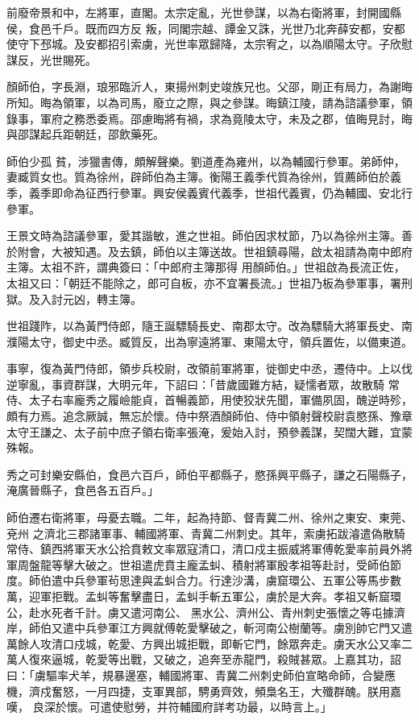 \begin{pinyinscope}
 前廢帝景和中，左將軍，直閣。太宗定亂，光世參謀，以為右衛將軍，封開國縣侯，食邑千戶。既而四方反
 叛，同閣宗越、譚金又誅，光世乃北奔薛安都，安都使守下邳城。及安都招引索虜，光世率眾歸降，太宗宥之，以為順陽太守。子欣慰謀反，光世賜死。



 顏師伯，字長淵，琅邪臨沂人，東揚州刺史竣族兄也。父邵，剛正有局力，為謝晦所知。晦為領軍，以為司馬，廢立之際，與之參謀。晦鎮江陵，請為諮議參軍，領錄事，軍府之務悉委焉。邵慮晦將有禍，求為竟陵太守，未及之郡，值晦見討，晦與邵謀起兵距朝廷，邵飲藥死。



 師伯少孤
 貧，涉獵書傳，頗解聲樂。劉道產為雍州，以為輔國行參軍。弟師仲，妻臧質女也。質為徐州，辟師伯為主簿。衡陽王義季代質為徐州，質薦師伯於義季，義季即命為征西行參軍。興安侯義賓代義季，世祖代義賓，仍為輔國、安北行參軍。



 王景文時為諮議參軍，愛其諧敏，進之世祖。師伯因求杖節，乃以為徐州主簿。善於附會，大被知遇。及去鎮，師伯以主簿送故。世祖鎮尋陽，啟太祖請為南中郎府主簿。太祖不許，謂典簽曰：「中郎府主簿那得
 用顏師伯。」世祖啟為長流正佐，太祖又曰：「朝廷不能除之，郎可自板，亦不宜署長流。」世祖乃板為參軍事，署刑獄。及入討元凶，轉主簿。



 世祖踐阼，以為黃門侍郎，隨王誕驃騎長史、南郡太守。改為驃騎大將軍長史、南濮陽太守，御史中丞。臧質反，出為寧遠將軍、東陽太守，領兵置佐，以備東道。



 事寧，復為黃門侍郎，領步兵校尉，改領前軍將軍，徙御史中丞，遷侍中。上以伐逆寧亂，事資群謀，大明元年，下詔曰：「昔歲國難方結，疑懦者眾，故散騎
 常侍、太子右率龐秀之履嶮能貞，首暢義節，用使狡狀先聞，軍備夙固，醜逆時殄，頗有力焉。追念厥誠，無忘於懷。侍中祭酒顏師伯、侍中領射聲校尉袁愍孫、豫章太守王謙之、太子前中庶子領右衛率張淹，爰始入討，預參義謀，契闊大難，宜蒙殊報。



 秀之可封樂安縣伯，食邑六百戶，師伯平都縣子，愍孫興平縣子，謙之石陽縣子，淹廣晉縣子，食邑各五百戶。」



 師伯遷右衛將軍，母憂去職。二年，起為持節、督青冀二州、徐州之東安、東莞、兗州
 之濟北三郡諸軍事、輔國將軍、青冀二州刺史。其年，索虜拓跋濬遣偽散騎常侍、鎮西將軍天水公拾賁敕文率眾寇清口，清口戍主振威將軍傅乾愛率前員外將軍周盤龍等擊大破之。世祖遣虎賁主龐孟虯、積射將軍殷孝祖等赴討，受師伯節度。師伯遣中兵參軍茍思達與孟虯合力。行達沙溝，虜窟環公、五軍公等馬步數萬，迎軍拒戰。孟虯等奮擊盡日，孟虯手斬五軍公，虜於是大奔。孝祖又斬窟環公，赴水死者千計。虜又遣河南公、
 黑水公、濟州公、青州刺史張懷之等屯據濟岸，師伯又遣中兵參軍江方興就傅乾愛擊破之，斬河南公樹蘭等。虜別帥它門又遣萬餘人攻清口戍城，乾愛、方興出城拒戰，即斬它門，餘眾奔走。虜天水公又率二萬人復來逼城，乾愛等出戰，又破之，追奔至赤龍門，殺賊甚眾。上嘉其功，詔曰：「虜驅率犬羊，規暴邊塞，輔國將軍、青冀二州刺史師伯宣略命師，合變應機，濟戍奮怒，一月四捷，支軍異部，騁勇齊效，頻梟名王，大殲群醜。朕用嘉嘆，
 良深於懷。可遣使慰勞，并符輔國府詳考功最，以時言上。」




\end{pinyinscope}
